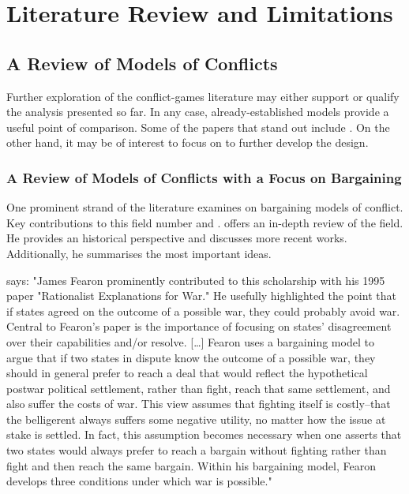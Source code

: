 
\section{Literature Review and Limitations}

\subsection{A Review of Models of Conflicts}
Further exploration of the conflict-games literature may either support or qualify the analysis presented so far. In any case, already-established models provide a useful point of comparison. Some of the papers that stand out include \textcite{schellingStrategyConflict1960, Schelling1966}. On the other hand, it may be of interest to focus on \textcite{mckelveyQuantalResponseEquilibria1995} to further develop the design.\

\subsubsection{A Review of Models of Conflicts with a Focus on Bargaining}
One prominent strand of the literature examines on bargaining models of conflict. Key contributions to this field number \textcite{Fearon1996, Fearon_1995, Fearon_1998} and \textcite{schellingStrategyConflict1960, Schelling1966}.
\textcite{reiterExploringBargainingModel2003} offers an in-depth review of the field. He provides an historical perspective and discusses more recent works. Additionally, he summarises the most important ideas.

\vspace*{1em}
\textcite{reiterExploringBargainingModel2003} says: "James Fearon prominently contributed to this scholarship with his 1995 paper "Rationalist Explanations for War." He usefully highlighted the point that if states agreed on the outcome of a possible war, they could probably avoid war. Central to Fearon's paper is the importance of focusing on states' disagreement over their capabilities and/or resolve. [\dots] Fearon uses a bargaining model to argue that if two states in dispute know the outcome of a possible war, they should in general prefer to reach a deal that would reflect the hypothetical postwar political settlement, rather than fight, reach that same settlement, and also suffer the costs of war. This view assumes that fighting itself is costly--that the belligerent always suffers some negative utility, no matter how the issue at stake is settled. In fact, this assumption becomes necessary when one asserts that two states would always prefer to reach a bargain without fighting rather than fight and then reach the same bargain. Within his bargaining model, Fearon develops three conditions under which war is possible."

